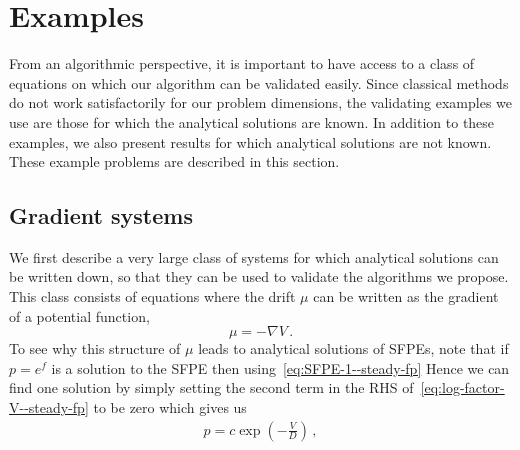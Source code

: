 \section{Examples}\label{sec-examples--steady-fp}
From an algorithmic perspective, it is important to have access to a class of equations on which our algorithm can be validated easily. Since classical methods do not work satisfactorily for our problem dimensions, the validating examples we use are those for which the analytical solutions are known. In addition to these examples, we also present results for which analytical solutions are not known. These example problems are described in this section.

\subsection{Gradient systems}
We first describe a very large class of systems for which analytical solutions can be written down, so that they can be used to validate the algorithms we propose. This class consists of equations where the drift $\mu$ can be written as the gradient of a potential function,
\begin{equation}
    \mu = -\nabla V \label{eq:mu-grad--steady-fp} \,.  
\end{equation}
To see why this structure of $\mu$ leads to analytical solutions of SFPEs, note that if $p=e^f$ is a solution to the SFPE then using~\eqref{eq:SFPE-1--steady-fp} 
Hence we can find one solution by simply setting the second term in the RHS of~\eqref{eq:log-factor-V--steady-fp} to be zero which gives us
\begin{align}
   p = c\exp\left(-\frac{V}{D}\right) \,,\label{eq:grad-sol--steady-fp}
\end{align}
